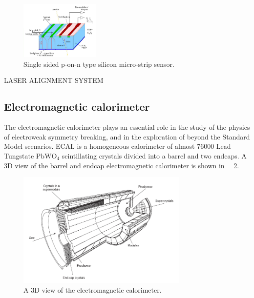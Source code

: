 \begin{figure}[htbp]
\centering
\includegraphics[width=0.35\textwidth]{Images/Silicon_structure}
\caption{Single sided p-on-n type silicon micro-strip sensor.}
\label{Silicon_structure}
\end{figure}

LASER ALIGNMENT SYSTEM

\subsection{Electromagnetic calorimeter}
The electromagnetic calorimeter plays an essential role in the study of the physics of electroweak symmetry breaking, and  in the exploration of  beyond the Standard Model scenarios.  ECAL is a homogeneous calorimeter of almost 76000 Lead Tungstate $\mathrm{PbWO_4}$ scintillating crystals divided into a barrel and two endcaps.
A $3$D view of the barrel and endcap electromagnetic calorimeter is shown in \figurename~~\ref{ECAL_3D}.
\begin{figure}[h!]
 \centering
 \includegraphics[width=0.75\textwidth]{Images/ECAL_3D}
 \caption{A $3$D view of the electromagnetic calorimeter.}
\label{ECAL_3D}
\end{figure}


